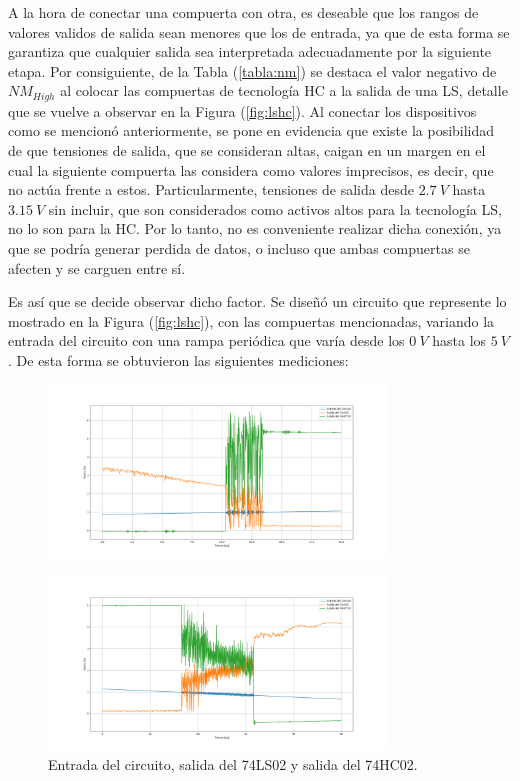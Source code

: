 A la hora de conectar una compuerta con otra, es deseable que los rangos de valores validos de salida sean menores que los de entrada, ya que de esta forma se garantiza que cualquier salida sea interpretada adecuadamente por la siguiente etapa. Por consiguiente, de la Tabla (\ref{tabla:nm}) se destaca el valor negativo de $NM_{High}$ al colocar las compuertas de tecnología HC a la salida de una LS, detalle que se vuelve a observar en la Figura (\ref{fig:lshc}). Al conectar los dispositivos como se mencionó anteriormente, se pone en evidencia que existe la posibilidad de que tensiones de salida, que se consideran altas, caigan en un margen en el cual la siguiente compuerta las considera como valores imprecisos, es decir, que no actúa frente a estos. Particularmente, tensiones de salida desde $2.7 \ V$ hasta $3.15 \ V$ sin incluir, que son considerados como activos altos para la tecnología LS, no lo son para la HC. Por lo tanto, no es conveniente realizar dicha conexión, ya que se podría generar perdida de datos, o incluso que ambas compuertas se afecten y se carguen entre sí.

Es así que se decide observar dicho factor. Se diseñó un circuito que represente lo mostrado en la Figura (\ref{fig:lshc}), con las compuertas mencionadas, variando la entrada del circuito con una rampa periódica que varía desde los $0 \ V$ hasta los $5 \ V$. De esta forma se obtuvieron las siguientes mediciones:

\begin{figure}[H]
\centering
	\includegraphics[width=0.8\textwidth]{ImagenesEjercicio2/scope_17_1.png}
\end{figure}
\vspace*{-1cm}
\begin{figure}[H]
\centering
	\includegraphics[width=0.8\textwidth]{ImagenesEjercicio2/scope_18_1.png}	
\caption{Entrada del circuito, salida del 74LS02 y salida del 74HC02.}
\label{fig:medicion1}
\end{figure} 

